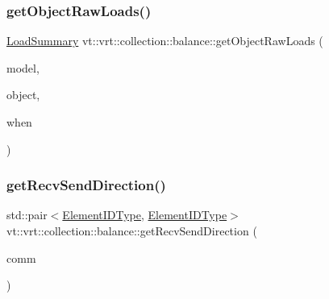 \mbox{\label{namespacevt_1_1vrt_1_1collection_1_1balance_a05566d60449203a260750b0ab3ab2834}} 
\subsubsection{\texorpdfstring{get\+Object\+Raw\+Loads()}{getObjectRawLoads()}\hspace{0.1cm}{\footnotesize\ttfamily [2/2]}}
{\footnotesize\ttfamily \hyperlink{structvt_1_1vrt_1_1collection_1_1balance_1_1_load_summary}{Load\+Summary} vt\+::vrt\+::collection\+::balance\+::get\+Object\+Raw\+Loads (\begin{DoxyParamCaption}\item[{\hyperlink{structvt_1_1vrt_1_1collection_1_1balance_1_1_load_model}{Load\+Model} $\ast$}]{model,  }\item[{\hyperlink{namespacevt_1_1vrt_1_1collection_1_1balance_a9f5b53fafb270212279a4757d2c4cd28}{Element\+I\+D\+Struct}}]{object,  }\item[{\hyperlink{structvt_1_1vrt_1_1collection_1_1balance_1_1_phase_offset}{Phase\+Offset}}]{when }\end{DoxyParamCaption})}

\mbox{\label{namespacevt_1_1vrt_1_1collection_1_1balance_a00d08e980a291c93c4c8b34101e7cd3f}} 
\subsubsection{\texorpdfstring{get\+Recv\+Send\+Direction()}{getRecvSendDirection()}}
{\footnotesize\ttfamily std\+::pair$<$\hyperlink{namespacevt_1_1vrt_1_1collection_1_1balance_a592736f733df4f90856df90a1fd08905}{Element\+I\+D\+Type}, \hyperlink{namespacevt_1_1vrt_1_1collection_1_1balance_a592736f733df4f90856df90a1fd08905}{Element\+I\+D\+Type}$>$ vt\+::vrt\+::collection\+::balance\+::get\+Recv\+Send\+Direction (\begin{DoxyParamCaption}\item[{\hyperlink{namespacevt_1_1elm_a89067ebf8407548591583dd2f60b53b5}{elm\+::\+Comm\+Key\+Type} const \&}]{comm }\end{DoxyParamCaption})}

